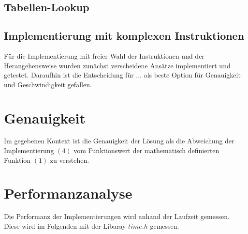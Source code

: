 \documentclass[course=erap] {aspdoc}
\begin{document}
    \subsection{Tabellen-Lookup}


    \subsection{Implementierung mit komplexen Instruktionen}
    Für die Implementierung mit freier Wahl der Instruktionen und der Herangehensweise wurden zunächst verscheidene Ansätze implementiert und getestet.
    Daraufhin ist die Entscheidung für ... als beste Option für Genauigkeit und Geschwindigkeit gefallen.


    \section{Genauigkeit}
    Im gegebenen Kontext ist die Genauigkeit der Lösung als die Abweichung der Implementierung $(4)$ vom Funktionswert der mathematisch definierten Funktion $(1)$ zu verstehen.


    \section{Performanzanalyse}
    Die Performanz der Implementierungen wird anhand der Laufzeit gemessen.
    Diese wird im Folgenden mit der Libaray $time.h$ gemessen.
\end{document}
